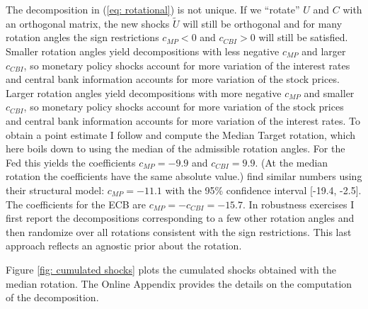 \documentclass[a4paper,12pt]{article}
\begin{document}
\newcommand{\vsmp}{\frac{\operatorname{var}(i^{MP})}{\operatorname{var}(i^{Total})}}
\newcommand{\vscbi}{\frac{\operatorname{var}(i^{CBI})}{\operatorname{var}(i^{Total})}}

The decomposition in (\ref{eq: rotational}) is not unique. 
If we ``rotate'' $U$ and $C$ with an orthogonal matrix, the new shocks $\tilde{U}$ will still be
orthogonal and for many rotation angles
the sign restrictions $c_{MP}<0$ and $c_{CBI}>0$ will still be satisfied.
Smaller rotation angles yield decompositions with less negative $c_{MP}$ and larger $c_{CBI}$,
so monetary policy shocks 
account for more variation of the interest rates and central bank information accounts for more variation of the stock prices.
Larger rotation angles yield decompositions with more negative $c_{MP}$ and smaller $c_{CBI}$,
so monetary policy shocks 
account for more variation of the stock prices and central bank information accounts for more variation of the interest rates.
To obtain a point estimate I follow \cite{Fry_Pagan_2011} and compute the Median Target rotation, which here boils down to using the median of the admissible rotation angles.
For the Fed this yields the coefficients $c_{MP}=-9.9$ and $c_{CBI}=9.9$.
(At the median rotation the coefficients have the same absolute value.)
\citet[][section VI.B]{Nakamura_Steinsson_2018} find similar numbers using their structural model:
$c_{MP}=-11.1$ with the 95\% confidence interval [-19.4, -2.5]. 
The coefficients for the ECB are $c_{MP}=-c_{CBI}=-15.7$.
In robustness exercises I first report the decompositions corresponding to a few other rotation angles and then randomize over all rotations consistent with the sign restrictions.
This last approach reflects an agnostic prior about the rotation.

Figure \ref{fig: cumulated shocks} plots the cumulated shocks obtained with the median rotation.
The Online Appendix provides the details on the computation of the decomposition.
\end{document}
